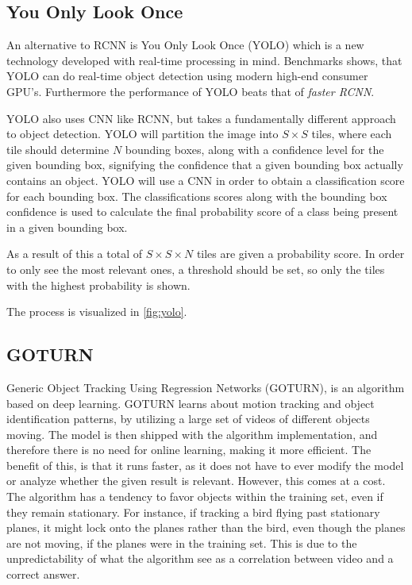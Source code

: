 \subsection{You Only Look Once}\label{sec:YOLOAnalysis}
An alternative to RCNN is You Only Look Once (YOLO) which is a new technology developed with real-time processing in mind.
Benchmarks shows, that YOLO can do real-time object detection using modern high-end consumer GPU's.
Furthermore the performance of YOLO beats that of \textit{faster RCNN}\cite{odDetection}.

YOLO also uses CNN like RCNN, but takes a fundamentally different approach to object detection.
YOLO will partition the image into $S\times S$ tiles, where each tile should determine $N$ bounding boxes, along with a confidence level for the given bounding box, signifying the confidence that a given bounding box actually contains an object.
YOLO will use a CNN in order to obtain a classification score for each bounding box.
The classifications scores along with the bounding box confidence is used to calculate the final probability score of a class being present in a given bounding box.\cite{odDetection}

As a result of this a total of $S\times S\times N$ tiles are given a probability score.
In order to only see the most relevant ones, a threshold should be set, so only the tiles with the highest probability is shown.

The process is visualized in \autoref{fig:yolo}.


\subsection{GOTURN}
Generic Object Tracking Using Regression Networks (GOTURN), is an algorithm based on deep learning\cite{goturn}.
GOTURN learns about motion tracking and object identification patterns, by utilizing a large set of videos of different objects moving.
The model is then shipped with the algorithm implementation, and therefore there is no need for online learning, making it more efficient.
The benefit of this, is that it runs faster, as it does not have to ever modify the model or analyze whether the given result is relevant.
However, this comes at a cost. 
The algorithm has a tendency to favor objects within the training set, even if they remain stationary.
For instance, if tracking a bird flying past stationary planes, it might lock onto the planes rather than the bird, even though the planes are not moving, if the planes were in the training set.
This is due to the unpredictability of what the algorithm see as a correlation between video and a correct answer.


